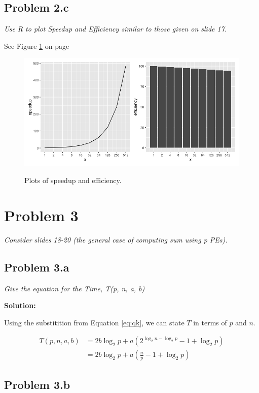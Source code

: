 \documentclass[12pt,letterpaper]{article}
\newcommand{\problem}[1]{\textit{#1} \medskip}
\newcommand{\solution}{ \noindent \textbf{Solution:} \medskip}
\begin{document}
\subsection*{Problem 2.c}

\problem{Use R to plot Speedup and Efficiency similar to those given on slide 17.}

See Figure \ref{fig:plot2} on page \pageref{fig:plot2}

\begin{figure}[h]
    \caption{Plots of speedup and efficiency.}
    \centering
    \includegraphics[width=7in]{plot2}
    \label{fig:plot2}
\end{figure}


\section*{Problem 3}

\problem{Consider slides 18-20 (the general case of computing sum using p PEs).}

\subsection*{Problem 3.a}

\problem{Give the equation for the Time, T(p, n, a, b)}

\solution

Using the substitition from Equation \ref{eq:qk}, we can state $T$ in terms of $p$ and $n$.

\begin{align}
    T(p, n, a, b) &= 2b\log_2{p} + a\left(2^{\log_2{n}-\log_2{p}}-1+\log_2{p}\right)\nonumber\\
    &= 2b\log_2{p} + a\left(\frac{n}{p}-1+\log_2{p}\right)
\end{align}

\subsection*{Problem 3.b}
\end{document}
